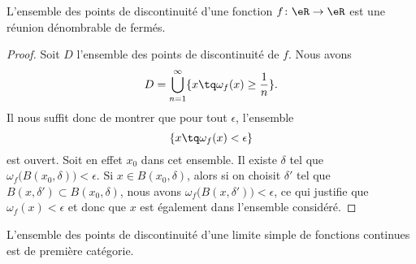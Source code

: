    \begin{lemma}       \label{LemuaPbtQ}
    L'ensemble des points de discontinuité d'une fonction \( f\colon \eR\to \eR\) est une réunion dénombrable de fermés.
\end{lemma}

\begin{proof}
    Soit \( D\) l'ensemble des points de discontinuité de \( f\). Nous avons
    \begin{equation}
        D=\bigcup_{n=1}^{\infty}\{ x\tq \omega_f(x)\geq \frac{1}{ n } \}.
    \end{equation}
    Il nous suffit donc de montrer que pour tout \( \epsilon\), l'ensemble
    \begin{equation}
        \{ x\tq \omega_f(x)<\epsilon \}
    \end{equation}
    est ouvert. Soit en effet \( x_0\) dans cet ensemble. Il existe \( \delta\) tel que \( \omega_f\big( B(x_0,\delta) \big)<\epsilon\). Si \( x\in B(x_0,\delta)\), alors si on choisit \( \delta'\) tel que \( B(x,\delta')\subset B(x_0,\delta)\), nous avons \( \omega_f\big( B(x,\delta') \big)<\epsilon\), ce qui justifie que \( \omega_f(x)<\epsilon\) et donc que \( x\) est également dans l'ensemble considéré.
\end{proof}

\begin{theorem}
    L'ensemble des points de discontinuité d'une limite simple de fonctions continues est de première catégorie.
\end{theorem}

